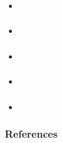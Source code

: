 \documentclass{beamer}
\begin{document}
\begin{frame}
  \frametitle{}
  \framesubtitle{}
  \begin{itemize}
    \item 
  \end{itemize}
\end{frame}

\begin{frame}
  \frametitle{}
  \framesubtitle{}
  \begin{itemize}
    \item 
  \end{itemize}
\end{frame}

\begin{frame}
  \frametitle{}
  \framesubtitle{}
  \begin{itemize}
    \item 
  \end{itemize}
\end{frame}

\begin{frame}
  \frametitle{}
  \framesubtitle{}
  \begin{itemize}
    \item 
  \end{itemize}
\end{frame}

\begin{frame}
  \frametitle{}
  \framesubtitle{}
  \begin{itemize}
    \item 
  \end{itemize}
\end{frame}

\begin{frame}
  \frametitle{References}


\end{frame}
\end{document}
